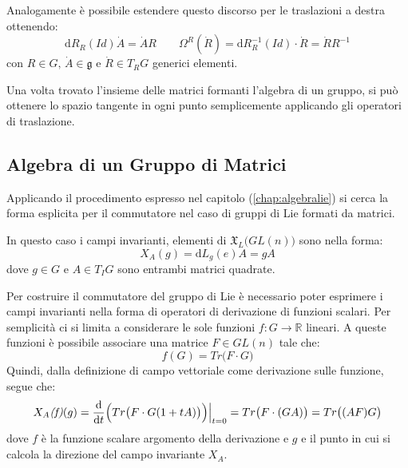 \documentclass[11pt]{report}
\theoremstyle{plain}
\theoremstyle{definition}
\theoremstyle{remark}
\begin{document}
Analogamente è possibile estendere questo discorso per le traslazioni a destra ottenendo:
	\begin{equation}\label{eq:maurercartandestramatrici}
\textrm{d}R_{R}(Id) \dot{A} = \dot{A}R \qquad \Omega^{R}(\dot{R}) = \textrm{d}R_{R}^{-1}(Id) \cdot \dot{R} = \dot{R} R^{-1} 
	\end{equation}
con $R \in G, \, \dot{A}\in \mathfrak{g}$ e $\dot{R}\in T_{R}G$ generici elementi.

Una volta trovato l'insieme delle matrici formanti l'algebra di un gruppo, si può ottenere lo spazio tangente in ogni punto semplicemente applicando gli operatori di traslazione.	


\subsection{Algebra di un Gruppo di Matrici}
Applicando il procedimento espresso nel capitolo (\ref{chap:algebralie}) si cerca la forma esplicita per il commutatore nel caso di gruppi di Lie formati da matrici.

In questo caso i campi invarianti, elementi di $\mathfrak{X}_{L}\Bigr(GL(n)\Bigr)$ sono nella forma:
$$X_{A}(g) = \textrm{d}L_{g}(e) A = gA$$
dove $g \in G$ e $A \in T_{I}G$ sono entrambi matrici quadrate.

Per costruire il commutatore del gruppo di Lie è necessario poter esprimere i campi invarianti nella forma di operatori di derivazione di funzioni scalari.
Per semplicità ci si limita a considerare le sole funzioni $f:G \rightarrow \mathbb{R}$ lineari. A queste funzioni è possibile associare una matrice $F \in GL(n)$ tale che:
	\begin{displaymath}
f(G) = Tr \Bigr( F \cdot G \Bigr)
	\end{displaymath}
Quindi, dalla definizione di campo vettoriale come derivazione sulle funzione, segue che:
	\begin{displaymath}
X_{A}\emph{(f)}(g) = \dfrac{\textrm{d} }{\textrm{d}t} \Bigr(Tr \bigr(F\cdot G( 1 + tA) \bigr) \Bigr) \Bigr|_{t=0} = Tr \bigr(F\cdot( G A) \bigr) = Tr\bigr((AF)G \bigr) 
	\end{displaymath}
dove $f$ è la funzione scalare argomento della derivazione e $g$ e il punto in cui si calcola la direzione del campo invariante $X_{A}$.
\end{document}
